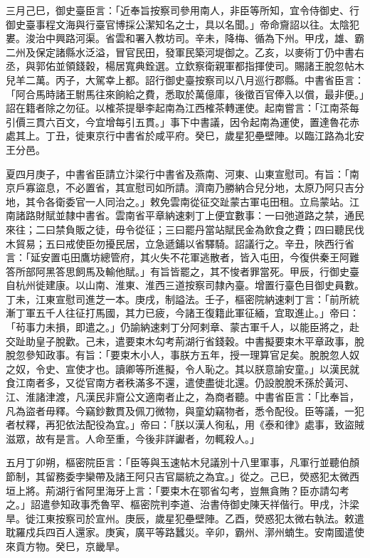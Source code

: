 \begin{pinyinscope}
 三月己巳，御史臺臣言：「近奉旨按察司參用南人，非臣等所知，宜令侍御史、行御史臺事程文海與行臺官博採公潔知名之士，具以名聞。」帝命齎詔以往。太陰犯婁。浚治中興路河渠。省雲和署入教坊司。辛未，降梅、循為下州。甲戌，雄、霸二州及保定諸縣水泛溢，冒官民田，發軍民築河堤御之。乙亥，以麥術丁仍中書右丞，與郭佑並領錢穀，楊居寬典銓選。立欽察衛親軍都指揮使司。賜諸王脫忽帖木兒羊二萬。丙子，大駕幸上都。詔行御史臺按察司以八月巡行郡縣。中書省臣言：「阿合馬時諸王駙馬往來餉給之費，悉取於萬億庫，後徵百官俸入以償，最非便。」詔在籍者除之勿征。以榷茶提舉李起南為江西榷茶轉運使。起南嘗言：「江南茶每引價三貫六百文，今宜增每引五貫。」事下中書議，因令起南為運使，置達魯花赤處其上。丁丑，徙東京行中書省於咸平府。癸巳，歲星犯壘壁陣。以臨江路為北安王分邑。



 夏四月庚子，中書省臣請立汴梁行中書省及燕南、河東、山東宣慰司。有旨：「南京戶寡盜息，不必置省，其宣慰司如所請。濟南乃勝納合兒分地，太原乃阿只吉分地，其令各衛委官一人同治之。」敕免雲南從征交趾蒙古軍屯田租。立烏蒙站。江南諸路財賦並隸中書省。雲南省平章納速剌丁上便宜數事：一曰弛道路之禁，通民來往；二曰禁負販之徒，毋令從征；三曰罷丹當站賦民金為飲食之費；四曰聽民伐木貿易；五曰戒使臣勿擾民居，立急遞鋪以省驛騎。詔議行之。辛丑，陜西行省言：「延安置屯田鷹坊總管府，其火失不花軍逃散者，皆入屯田，今復供秦王阿難答所部阿黑答思飼馬及輸他賦。」有旨皆罷之，其不悛者罪當死。甲辰，行御史臺自杭州徙建康。以山南、淮東、淮西三道按察司隸內臺。增置行臺色目御史員數。丁未，江東宣慰司進芝一本。庚戌，制謚法。壬子，樞密院納速剌丁言：「前所統漸丁軍五千人往征打馬國，其力已疲，今諸王復籍此軍征緬，宜取進止。」帝曰：「茍事力未損，即遣之。」仍諭納速剌丁分阿剌章、蒙古軍千人，以能臣將之，赴交趾助皇子脫歡。己未，遣要束木勾考荊湖行省錢穀。中書擬要束木平章政事，脫脫忽參知政事。有旨：「要束木小人，事朕方五年，授一理算官足矣。脫脫忽人奴之奴，令史、宣使才也。讀卿等所進擬，令人恥之。其以朕意諭安童。」以漢民就食江南者多，又從官南方者秩滿多不還，遣使盡徙北還。仍設脫脫禾孫於黃河、江、淮諸津渡，凡漢民非齎公文適南者止之，為商者聽。中書省臣言：「比奉旨，凡為盜者毋釋。今竊鈔數貫及佩刀微物，與童幼竊物者，悉令配役。臣等議，一犯者杖釋，再犯依法配役為宜。」帝曰：「朕以漢人徇私，用《泰和律》處事，致盜賊滋眾，故有是言。人命至重，今後非詳讞者，勿輒殺人。」



 五月丁卯朔，樞密院臣言：「臣等與玉速帖木兒議別十八里軍事，凡軍行並聽伯顏節制，其留務委孛欒帶及諸王阿只吉官屬統之為宜。」從之。己巳，熒惑犯太微西垣上將。荊湖行省阿里海牙上言：「要束木在鄂省勾考，豈無貪賄？臣亦請勾考之。」詔遣參知政事禿魯罕、樞密院判李道、治書侍御史陳天祥偕行。甲戌，汴梁旱。徙江東按察司於宣州。庚辰，歲星犯壘壁陣。乙酉，熒惑犯太微右執法。敕遣耽羅戍兵四百人還家。庚寅，廣平等路蠶災。辛卯，霸州、漷州蝻生。安南國遣使來貢方物。癸巳，京畿旱。




\end{pinyinscope}
